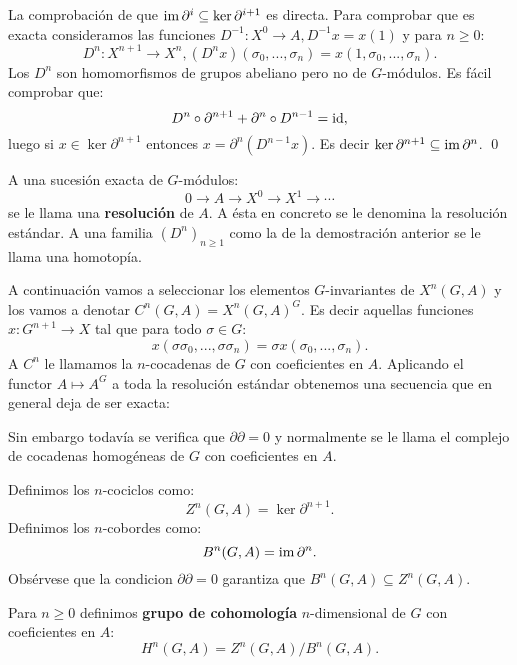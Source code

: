 \documentclass[a4paper,12pt, leqno]{report}
\begin{document}
\begin{dem}
	La comprobación de que $\mathrm{im}\, \partial^i \subseteq \ker \partial^{i+1}$ es directa. Para comprobar que es exacta consideramos las funciones $D^{-1}:X^0 \rightarrow A,D^{-1}x=x(1)$ y para $n\geq 0$:
	\begin{equation*}
	D^n:X^{n+1} \rightarrow X^n,(D^n x)(\sigma_0,...,\sigma_n)=x(1,\sigma_0,...,\sigma_n).
	\end{equation*}
	Los $D^n$ son homomorfismos de grupos abeliano pero no de $G$-módulos. Es fácil comprobar que:
	\begin{equation*}
	D^n \circ \partial^{n+1}+\partial^n\circ D^{n-1} = \mathrm{id},
	\end{equation*}
	luego si $x \in \ker \partial^{n+1}$ entonces $x=\partial^n(D^{n-1}x)$. Es decir $\ker \partial^{n+1}\subseteq \mathrm{im}\, \partial^n$. \qed
\end{dem}
\begin{definicion}
	A una sucesión exacta de $G$-módulos:
	\begin{equation*}
	0 \rightarrow  A \rightarrow X^0 \rightarrow X^1 \rightarrow \cdots
	\end{equation*}
	se le llama una \textbf{resolución} de $A$. A ésta en concreto se le denomina la resolución estándar. A una familia $(D^n)_{n\geq 1}$ como la de la demostración anterior se le llama una homotopía. 
\end{definicion}
A continuación vamos a seleccionar los elementos $G$-invariantes de $X^n(G,A)$ y los vamos a denotar $C^n(G,A)=X^n(G,A)^G$. Es decir aquellas funciones $x: G^{n+1}\rightarrow X$ tal que para todo $\sigma \in G$:
\begin{equation*}
x(\sigma \sigma_0,...,\sigma \sigma_n)=\sigma x(\sigma_0,...,\sigma_n).
\end{equation*}
A $C^n$ le llamamos la $n$-cocadenas de $G$ con coeficientes en $A$. Aplicando el functor $A \mapsto A^G$ a toda la resolución estándar obtenemos una secuencia que en general deja de ser exacta:
\begin{center}
\end{center}
Sin embargo todavía se verifica que $\partial \partial =0$ y normalmente se le llama el complejo de cocadenas homogéneas de $G$ con coeficientes en $A$.
\begin{definicion}
	Definimos los $n$-cociclos como:
	\begin{equation*}
	Z^n(G,A)=\ker \partial^{n+1}.
	\end{equation*}
	Definimos los $n$-cobordes como:
	\begin{equation*}
	B^n(G,A)= \mathrm{im}\, \partial^n.
	\end{equation*}
	Obsérvese que la condicion $\partial \partial=0$ garantiza que $B^n(G,A)\subseteq Z^n(G,A)$.
	
	Para $n\geq 0$ definimos \textbf{grupo de cohomología} $n$-dimensional de $G$ con coeficientes en $A$:
	\begin{equation*}
	H^n(G,A)=Z^n(G,A)/B^n(G,A).
	\end{equation*}
\end{definicion}
\end{document}
